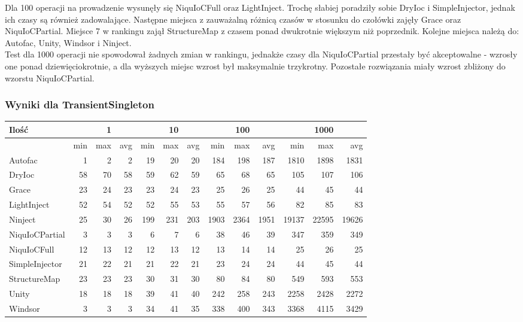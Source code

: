\documentclass[12pt]{article}
\begin{document}
Dla 100 operacji na prowadzenie wysunęły się NiquIoCFull oraz LightInject. Trochę słabiej poradziły sobie DryIoc i SimpleInjector, jednak ich czasy są również zadowalające. Następne miejsca z zauważalną różnicą czasów w stosunku do czołówki zajęły Grace oraz NiquIoCPartial. Miejsce 7 w rankingu zajął StructureMap z czasem ponad dwukrotnie większym niż poprzednik. Kolejne miejsca należą do: Autofac, Unity, Windsor i Ninject.\\
Test dla 1000 operacji nie spowodował żadnych zmian w rankingu, jednakże czasy dla NiquIoCPartial przestały być akceptowalne - wzrosły one ponad dziewięciokrotnie, a dla wyższych miejsc wzrost był maksymalnie trzykrotny. Pozostałe rozwiązania miały wzrost zbliżony do wzorstu NiquIoCPartial.

\subsubsection{Wyniki dla TransientSingleton}
\begin{center}
\begin{small}
	\begin{tabular}{ | l | r r r | r r r | r r r | r r r | }
    		\hline
Ilość & & 1 & & & 10 & & & 100 & & & 1000 & \\ \hline
 & min & max & avg & min & max & avg & min & max & avg & min & max & avg \\ \hline
Autofac & 1 & 2 & 2 & 19 & 20 & 20 & 184 & 198 & 187 & 1810 & 1898 & 1831 \\ \hline
DryIoc & 58 & 70 & 58 & 59 & 62 & 59 & 65 & 68 & 65 & 105 & 107 & 106 \\ \hline
Grace & 23 & 24 & 23 & 23 & 24 & 23 & 25 & 26 & 25 & 44 & 45 & 44 \\ \hline
LightInject & 52 & 54 & 52 & 52 & 55 & 53 & 55 & 57 & 56 & 82 & 85 & 83 \\ \hline
Ninject & 25 & 30 & 26 & 199 & 231 & 203 & 1903 & 2364 & 1951 & 19137 & 22595 & 19626 \\ \hline
NiquIoCPartial & 3 & 3 & 3 & 6 & 7 & 6 & 38 & 46 & 39 & 347 & 359 & 349 \\ \hline
NiquIoCFull & 12 & 13 & 12 & 12 & 13 & 12 & 13 & 14 & 14 & 25 & 26 & 25 \\ \hline
SimpleInjector & 21 & 22 & 21 & 21 & 22 & 21 & 23 & 24 & 24 & 44 & 45 & 44 \\ \hline
StructureMap & 23 & 23 & 23 & 30 & 31 & 30 & 80 & 84 & 80 & 549 & 593 & 553 \\ \hline
Unity & 18 & 18 & 18 & 39 & 41 & 40 & 242 & 258 & 243 & 2258 & 2428 & 2272 \\ \hline
Windsor & 3 & 3 & 3 & 34 & 41 & 35 & 338 & 400 & 343 & 3368 & 4115 & 3429 \\ \hline
  	\end{tabular}
\end{small}
\end{center}
\end{document}
